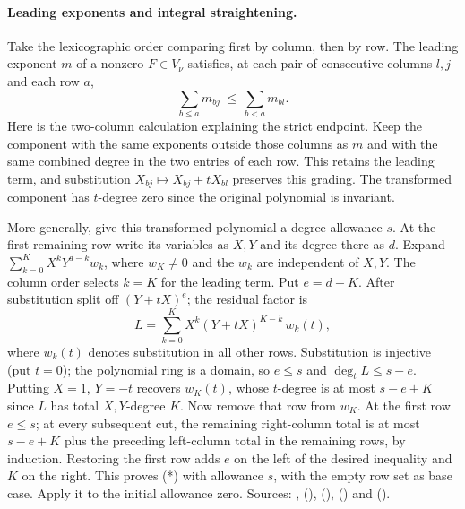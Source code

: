 \paragraph{Leading exponents and integral straightening.}
Take the lexicographic order comparing first by column, then by row.
The leading exponent $m$ of a nonzero $F\in V_\nu$ satisfies, at
each pair of consecutive columns $l,j$ and each row $a$,
\[
       \sum_{b\le a}m_{bj}\ \le\ \sum_{b<a}m_{bl}.                 \tag{*}
\]
Here is the two-column calculation explaining the strict endpoint.
Keep the component with the same exponents outside those columns as
$m$ and with the same combined degree in the two entries of each row.
This retains the leading term, and substitution
$X_{bj}\mapsto X_{bj}+tX_{bl}$ preserves this grading. The transformed
component has $t$-degree zero since the original polynomial is invariant.

More generally, give this transformed polynomial a degree allowance
$s$. At the first remaining row write its variables as $X,Y$ and its
degree there as $d$. Expand $\sum_{k=0}^K X^kY^{d-k}w_k$,
where $w_K\ne0$ and the $w_k$ are independent of $X,Y$.
The column order selects $k=K$ for the leading term. Put $e=d-K$.
After substitution split off $(Y+tX)^e$; the residual factor is
\[
       L=\sum_{k=0}^{K} X^k(Y+tX)^{K-k}\,w_k(t),
\]
where $w_k(t)$ denotes substitution in all other rows.
Substitution is injective (put $t=0$); the polynomial ring is a
domain, so $e\le s$ and $\deg_t L\le s-e$. Putting $X=1$, $Y=-t$
recovers $w_K(t)$, whose $t$-degree is at most $s-e+K$ since $L$
has total $X,Y$-degree $K$. Now remove that row from $w_K$.
At the first row $e\le s$; at every subsequent cut, the remaining
right-column total is at most $s-e+K$ plus the preceding left-column
total in the remaining rows, by induction. Restoring the first row
adds $e$ on the left of the desired inequality and $K$ on the right.
This proves (*) with allowance $s$, with the empty row set as base
case. Apply it to the initial allowance zero. Sources:
,  (),
 (),
 () and
 ().

